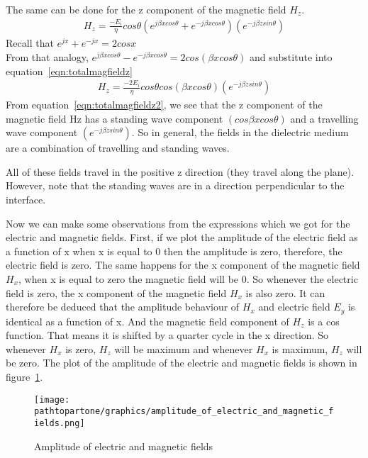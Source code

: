 The same can be done for the z component of the magnetic field $H_z$.
\begin{align}
H_z = \frac{-E_i}{\eta}cos\theta(e^{j\beta xcos\theta} + e^{-j\beta xcos\theta}) (e^{-j\beta zsin\theta})
\label{eqn:totalmagfieldz}
\end{align}  
Recall that $e^{jx} + e^{-jx} = 2cosx$\\
From that analogy, $e^{j\beta xcos \theta} - e^{-j\beta xcos\theta} = 2cos(\beta xcos\theta)$ and substitute into equation~\eqref{eqn:totalmagfieldz}
\begin{align}
H_z = \frac{-2E_i}{\eta}cos\theta cos(\beta xcos\theta) (e^{-j \beta zsin\theta})
\label{eqn:totalmagfieldz2}
\end{align}
From equation~\eqref{eqn:totalmagfieldz2}, we see that the z component of the magnetic field Hz has a standing wave component $(cos\beta xcos\theta)$ and a travelling wave component $(e^{-j\beta zsin\theta})$. So in general, the fields in the dielectric medium are a combination of travelling and standing waves.

All of these fields travel in the positive z direction (they travel along the plane). However, note that the standing waves are in a direction perpendicular to the interface.

Now we can make some observations from the expressions which we got for the electric and magnetic fields. First, if we plot the amplitude of the electric field as a function of x when x is equal to 0 then the amplitude is zero, therefore, the electric field is zero. The same happens for the x component of the magnetic field $H_x$, when x is equal to zero the magnetic field will be 0. So whenever the electric field is zero, the x component of the magnetic field $H_x$ is also zero. It can therefore be deduced that the amplitude behaviour of $H_x$ and electric field $E_y$ is identical as a function of x. And the magnetic field component of $H_z$ is a cos function. That means it is shifted by a quarter cycle in the x direction. So whenever $H_x$ is zero, $H_z$ will be maximum and whenever $H_x$ is maximum, $H_z$ will be zero. The plot of the amplitude of the electric and magnetic fields is shown in figure~\ref{fig:amplitude}.
\begin{figure}[h]
\centering
\texttt{[image: \\pathtopartone/graphics/amplitude\_of\_electric\_and\_magnetic\_fields.png]}
\caption{Amplitude of electric and magnetic fields}
\label{fig:amplitude}
\end{figure}

